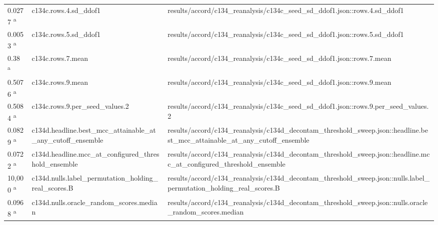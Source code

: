 \begin{longtable}{@{}p{0.7in}p{1.9in}p{2.6in}@{}}
0.0277 \textsuperscript{a} & c134c.\allowbreak{}rows.\allowbreak{}4.\allowbreak{}sd\_ddof1 & results/\allowbreak{}accord/\allowbreak{}c134\_reanalysis/\allowbreak{}c134c\_seed\_sd\_ddof1.\allowbreak{}json::rows.\allowbreak{}4.\allowbreak{}sd\_ddof1\\
0.0053 \textsuperscript{a} & c134c.\allowbreak{}rows.\allowbreak{}5.\allowbreak{}sd\_ddof1 & results/\allowbreak{}accord/\allowbreak{}c134\_reanalysis/\allowbreak{}c134c\_seed\_sd\_ddof1.\allowbreak{}json::rows.\allowbreak{}5.\allowbreak{}sd\_ddof1\\
0.38 \textsuperscript{a} & c134c.\allowbreak{}rows.\allowbreak{}7.\allowbreak{}mean & results/\allowbreak{}accord/\allowbreak{}c134\_reanalysis/\allowbreak{}c134c\_seed\_sd\_ddof1.\allowbreak{}json::rows.\allowbreak{}7.\allowbreak{}mean\\
0.5076 \textsuperscript{a} & c134c.\allowbreak{}rows.\allowbreak{}9.\allowbreak{}mean & results/\allowbreak{}accord/\allowbreak{}c134\_reanalysis/\allowbreak{}c134c\_seed\_sd\_ddof1.\allowbreak{}json::rows.\allowbreak{}9.\allowbreak{}mean\\
0.5084 \textsuperscript{a} & c134c.\allowbreak{}rows.\allowbreak{}9.\allowbreak{}per\_seed\_values.\allowbreak{}2 & results/\allowbreak{}accord/\allowbreak{}c134\_reanalysis/\allowbreak{}c134c\_seed\_sd\_ddof1.\allowbreak{}json::rows.\allowbreak{}9.\allowbreak{}per\_seed\_values.\allowbreak{}2\\
0.0829 \textsuperscript{a} & c134d.\allowbreak{}headline.\allowbreak{}best\_mcc\_attainable\_at\_any\_cutoff\_ensemble & results/\allowbreak{}accord/\allowbreak{}c134\_reanalysis/\allowbreak{}c134d\_decontam\_threshold\_sweep.\allowbreak{}json::headline.\allowbreak{}best\_mcc\_attainable\_at\_any\_cutoff\_ensemble\\
0.0722 \textsuperscript{a} & c134d.\allowbreak{}headline.\allowbreak{}mcc\_at\_configured\_threshold\_ensemble & results/\allowbreak{}accord/\allowbreak{}c134\_reanalysis/\allowbreak{}c134d\_decontam\_threshold\_sweep.\allowbreak{}json::headline.\allowbreak{}mcc\_at\_configured\_threshold\_ensemble\\
10,000 \textsuperscript{a} & c134d.\allowbreak{}nulls.\allowbreak{}label\_permutation\_holding\_real\_scores.\allowbreak{}B & results/\allowbreak{}accord/\allowbreak{}c134\_reanalysis/\allowbreak{}c134d\_decontam\_threshold\_sweep.\allowbreak{}json::nulls.\allowbreak{}label\_permutation\_holding\_real\_scores.\allowbreak{}B\\
0.0968 \textsuperscript{a} & c134d.\allowbreak{}nulls.\allowbreak{}oracle\_random\_scores.\allowbreak{}median & results/\allowbreak{}accord/\allowbreak{}c134\_reanalysis/\allowbreak{}c134d\_decontam\_threshold\_sweep.\allowbreak{}json::nulls.\allowbreak{}oracle\_random\_scores.\allowbreak{}median\\

\end{longtable}
